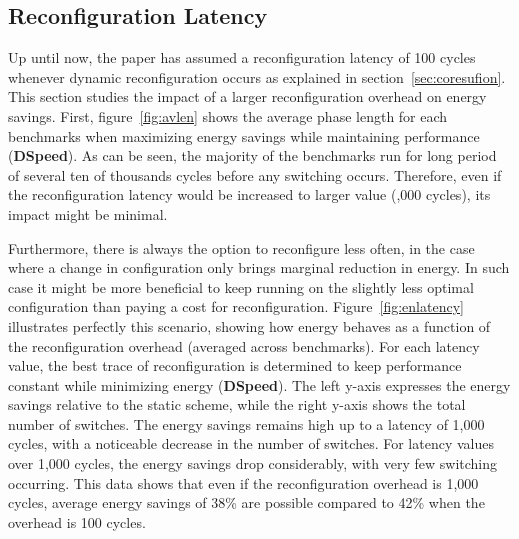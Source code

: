 \subsection{Reconfiguration Latency} \label{sec:reconfoverhead}

Up until now, the paper has assumed a reconfiguration latency of 100 cycles whenever dynamic reconfiguration occurs as explained in section~\ref{sec:coresufion}.
This section studies the impact of a larger reconfiguration overhead on energy savings.
First, figure~\ref{fig:avlen} shows the average phase length for each benchmarks when maximizing energy savings while maintaining performance (\textbf{DSpeed}).
As can be seen, the majority of the benchmarks run for long period of several ten of thousands cycles before any switching occurs.
Therefore, even if the reconfiguration latency would be increased to larger value (,000 cycles), its impact might be minimal.

Furthermore, there is always the option to reconfigure less often, in the case where a change in configuration only brings marginal reduction in energy.
In such case it might be more beneficial to keep running on the slightly less optimal configuration than paying a cost for reconfiguration.
Figure~\ref{fig:enlatency} illustrates perfectly this scenario, showing how energy behaves as a function of the reconfiguration overhead (averaged across benchmarks).
For each latency value, the best trace of reconfiguration is determined to keep performance constant while minimizing energy (\textbf{DSpeed}).
The left y-axis expresses the energy savings relative to the static scheme, while the right y-axis shows the total number of switches.
The energy savings remains high up to a latency of 1,000 cycles, with a noticeable decrease in the number of switches.
For latency values over 1,000 cycles, the energy savings drop considerably, with very few switching occurring.
This data shows that even if the reconfiguration overhead is 1,000 cycles, average energy savings of 38\% are possible compared to 42\% when the overhead is 100 cycles.

